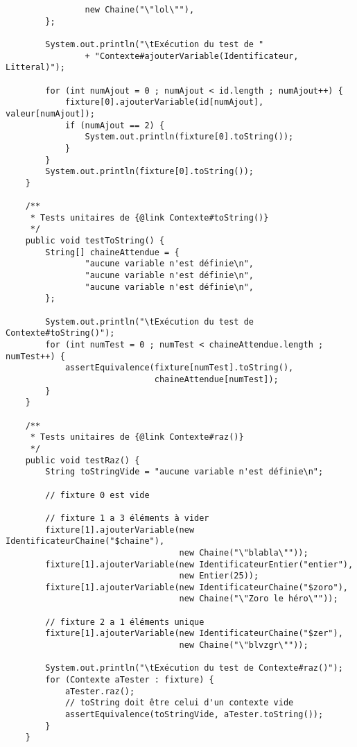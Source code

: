 \begin{enum}
\begin{verbatim}
                new Chaine("\"lol\""),
        };
        
        System.out.println("\tExécution du test de "
                + "Contexte#ajouterVariable(Identificateur, Litteral)");
        
        for (int numAjout = 0 ; numAjout < id.length ; numAjout++) {
            fixture[0].ajouterVariable(id[numAjout], valeur[numAjout]);
            if (numAjout == 2) {
                System.out.println(fixture[0].toString());
            }
        }
        System.out.println(fixture[0].toString());
    }
    
    /**
     * Tests unitaires de {@link Contexte#toString()}
     */
    public void testToString() {
        String[] chaineAttendue = {
                "aucune variable n'est définie\n",
                "aucune variable n'est définie\n",
                "aucune variable n'est définie\n",
        };
        
        System.out.println("\tExécution du test de Contexte#toString()");
        for (int numTest = 0 ; numTest < chaineAttendue.length ; numTest++) {
            assertEquivalence(fixture[numTest].toString(),
                              chaineAttendue[numTest]);
        }
    }
    
    /**
     * Tests unitaires de {@link Contexte#raz()}
     */
    public void testRaz() {
        String toStringVide = "aucune variable n'est définie\n";
        
        // fixture 0 est vide
        
        // fixture 1 a 3 éléments à vider
        fixture[1].ajouterVariable(new IdentificateurChaine("$chaine"), 
                                   new Chaine("\"blabla\""));
        fixture[1].ajouterVariable(new IdentificateurEntier("entier"), 
                                   new Entier(25));
        fixture[1].ajouterVariable(new IdentificateurChaine("$zoro"), 
                                   new Chaine("\"Zoro le héro\""));
        
        // fixture 2 a 1 éléments unique
        fixture[1].ajouterVariable(new IdentificateurChaine("$zer"), 
                                   new Chaine("\"blvzgr\""));
        
        System.out.println("\tExécution du test de Contexte#raz()");
        for (Contexte aTester : fixture) {
            aTester.raz();
            // toString doit être celui d'un contexte vide
            assertEquivalence(toStringVide, aTester.toString());
        }
    }
    

\end{verbatim}
\end{enum}
